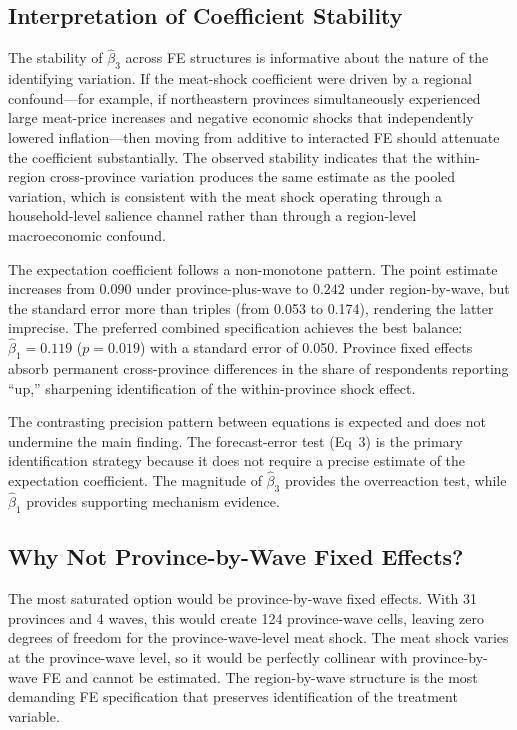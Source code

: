 \subsection{Interpretation of Coefficient Stability}

The stability of $\hat{\beta}_3$ across FE structures is
informative about the nature of the identifying variation.
If the meat-shock coefficient were driven by a regional
confound---for example, if northeastern provinces
simultaneously experienced large meat-price increases and
negative economic shocks that independently lowered
inflation---then moving from additive to interacted FE
should attenuate the coefficient substantially.
The observed stability indicates that the within-region
cross-province variation produces the same estimate as the
pooled variation, which is consistent with the meat shock
operating through a household-level salience channel rather
than through a region-level macroeconomic confound.

The expectation coefficient follows a non-monotone pattern.
The point estimate increases from $0.090$ under
province-plus-wave to $0.242$ under region-by-wave, but the
standard error more than triples (from 0.053 to 0.174),
rendering the latter imprecise.
The preferred combined specification achieves the best balance:
$\hat{\beta}_1 = 0.119$ ($p = 0.019$) with a standard error
of 0.050.
Province fixed effects absorb permanent cross-province
differences in the share of respondents reporting ``up,''
sharpening identification of the within-province shock effect.

The contrasting precision pattern between equations is
expected and does not undermine the main finding.
The forecast-error test (Eq~3) is the primary identification
strategy because it does not require a precise estimate of the
expectation coefficient.
The magnitude of $\hat{\beta}_3$ provides the overreaction
test, while $\hat{\beta}_1$ provides supporting mechanism
evidence.

\subsection{Why Not Province-by-Wave Fixed Effects?}

The most saturated option would be province-by-wave fixed
effects.
With 31 provinces and 4 waves, this would create 124
province-wave cells, leaving zero degrees of freedom for the
province-wave-level meat shock.
The meat shock varies at the province-wave level, so it
would be perfectly collinear with province-by-wave FE and
cannot be estimated.
The region-by-wave structure is the most demanding FE
specification that preserves identification of the
treatment variable.
